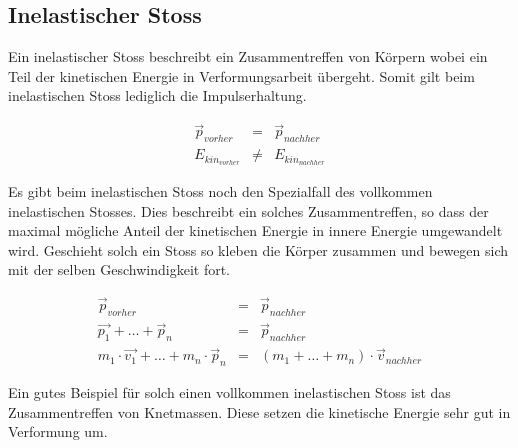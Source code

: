 \subsection{Inelastischer Stoss}
Ein inelastischer Stoss beschreibt ein Zusammentreffen von Körpern wobei ein
Teil der kinetischen Energie in Verformungsarbeit übergeht. Somit gilt beim
inelastischen Stoss lediglich die Impulserhaltung. 

\[ \boxed{
	\begin{array}{rcl}
		\vec{p}_{vorher} &= &\vec{p}_{nachher} \\
		E_{kin_{vorher}} &\neq &E_{kin_{nachher}}
	\end{array}
} \]

\noindent
Es gibt beim inelastischen Stoss noch den Spezialfall des vollkommen 
inelastischen Stosses. Dies beschreibt ein solches Zusammentreffen, so dass
der maximal mögliche Anteil der kinetischen Energie in innere Energie
umgewandelt wird. Geschieht solch ein Stoss so kleben die Körper zusammen
und bewegen sich mit der selben Geschwindigkeit fort.

\[ \boxed{
	\begin{array}{rcl}
		\vec{p}_{vorher} &= & \vec{p}_{nachher} \\
		\vec{p_1} + \dots + \vec{p}_n &= &\vec{p}_{nachher} \\
		m_1 \cdot \vec{v_1} + \dots + m_n \cdot \vec{p}_n&= 
			& (m_1 + \dots + m_n)\cdot \vec{v}_{nachher}
	\end{array}
} \]

\noindent
Ein gutes Beispiel für solch einen vollkommen inelastischen Stoss ist
das Zusammentreffen von Knetmassen. Diese setzen die kinetische Energie
sehr gut in Verformung um.

